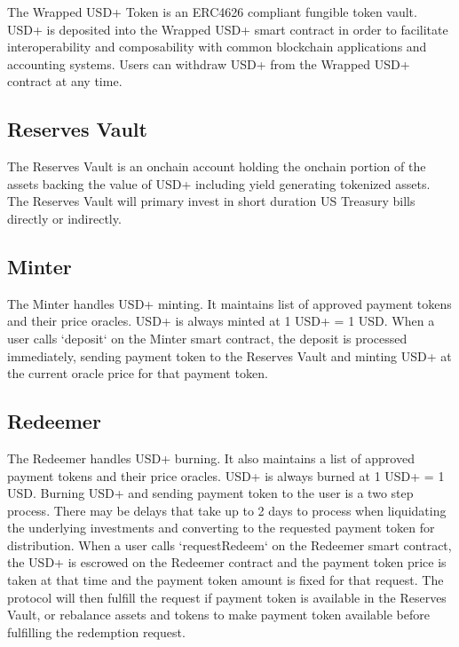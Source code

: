 \documentclass[sigconf,nonacm,prologue,table]{acmart}
\begin{document}
The Wrapped USD+ Token is an ERC4626 compliant fungible token vault. USD+ is deposited into the Wrapped USD+ smart contract in order to facilitate interoperability and composability with common blockchain applications and accounting systems. Users can withdraw USD+ from the Wrapped USD+ contract at any time.

\subsection{Reserves Vault}

The Reserves Vault is an onchain account holding the onchain portion of the assets backing the value of USD+ including yield generating tokenized assets. The Reserves Vault will primary invest in short duration US Treasury bills directly or indirectly.

\subsection{Minter}

The Minter handles USD+ minting. It maintains list of approved payment tokens and their price oracles. USD+ is always minted at 1 USD+ = 1 USD. When a user calls `deposit` on the Minter smart contract, the deposit is processed immediately, sending payment token to the Reserves Vault and minting USD+ at the current oracle price for that payment token.

\subsection{Redeemer}

The Redeemer handles USD+ burning. It also maintains a list of approved payment tokens and their price oracles. USD+ is always burned at 1 USD+ = 1 USD. Burning USD+ and sending payment token to the user is a two step process. There may be delays that take up to 2 days to process when liquidating the underlying investments and converting to the requested payment token for distribution. When a user calls `requestRedeem` on the Redeemer smart contract, the USD+ is escrowed on the Redeemer contract and the payment token price is taken at that time and the payment token amount is fixed for that request. The protocol will then fulfill the request if payment token is available in the Reserves Vault, or rebalance assets and tokens to make payment token available before fulfilling the redemption request.

\end{document}
